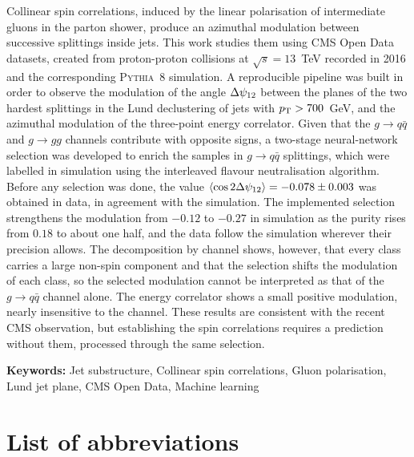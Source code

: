 \documentclass{istdissertacao}
\newcommand{\ISTbodylang}{english}
\begin{document}
Collinear spin correlations, induced by the linear polarisation of intermediate
gluons in the parton shower, produce an azimuthal modulation between successive
splittings inside jets. This work studies them using CMS Open Data datasets, created
from proton-proton collisions at $\sqrt{s} = 13$~TeV recorded in 2016 and the
corresponding \textsc{Pythia}~8 simulation. A reproducible pipeline was built 
in order to observe the modulation of the angle $\Delta\psi_{12}$ between the planes of the
two hardest splittings in the Lund declustering of jets with $p_{\mathrm{T}} > 700$~GeV, and
the azimuthal modulation of the three-point energy correlator. Given that 
the $g \to q\bar{q}$ and $g \to gg$ channels contribute with opposite signs, a
two-stage neural-network selection was developed to enrich the samples in
$g \to q\bar{q}$ splittings, which were labelled in simulation using the
interleaved flavour neutralisation algorithm. Before any selection was done, the value
$\langle \cos 2\Delta\psi_{12} \rangle = -0.078 \pm 0.003$ was obtained in data, in agreement with the
simulation. The implemented selection strengthens the modulation from $-0.12$ to $-0.27$ in
simulation as the purity rises from $0.18$ to about one half, and the data follow
the simulation wherever their precision allows. The decomposition by channel
shows, however, that every class carries a large non-spin component and that the
selection shifts the modulation of each class, so the selected modulation cannot
be interpreted as that of the $g \to q\bar{q}$ channel alone. The energy
correlator shows a small positive modulation, nearly insensitive to the channel.
These results are consistent with the recent CMS observation, but establishing the
spin correlations requires a prediction without them, processed through the same
selection. 


\vspace{1em}
\textbf{Keywords:} Jet substructure, Collinear spin correlations, Gluon
polarisation, Lund jet plane, CMS Open Data, Machine learning

\cleardoublepage
\selectlanguage{\ISTbodylang}

\tableofcontents

\cleardoublepage
{}
{}
\listoftables

\cleardoublepage
{}
{}
\listoffigures

\chapter*{List of abbreviations}
\end{document}
